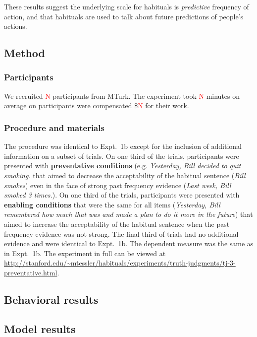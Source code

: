 \documentclass[10pt,letterpaper]{article}
\newcommand{\red}[1]{\textcolor{Red}{#1}}
\begin{document}
These results suggest the underlying scale for habituals is \emph{predictive} frequency of action, and that habituals are used to talk about future predictions of people's actions.

\subsection{Method}

\subsubsection{Participants} 

We recruited \red{N} participants from MTurk.
The experiment took \red{N} minutes on average on participants were compensated \$\red{N} for their work.

\subsubsection{Procedure and materials}

The procedure was identical to Expt.~1b except for the inclusion of additional information on a subset of trials. 
On one third of the trials, participants were presented with \textbf{preventative conditions} (e.g. \emph{Yesterday, Bill decided to quit smoking.} that aimed to decrease the acceptability of the habitual sentence (\emph{Bill smokes}) even in the face of strong past frequency evidence (\emph{Last week, Bill smoked 3 times.}).
On one third of the trials, participants were presented with \textbf{enabling conditions} that were the same for all items (\emph{Yesterday, Bill remembered how much that was and made a plan to do it more in the future}) that aimed to increase the acceptability of the habitual sentence when the past frequency evidence was not strong. 
The final third of trials had no additional evidence and were identical to Expt.~1b. 
The dependent measure was the same as in Expt.~1b. 
The experiment in full can be viewed at \url{http://stanford.edu/~mtessler/habituals/experiments/truth-judgments/tj-3-preventative.html}.


\subsection{Behavioral results}

\subsection{Model results}
\end{document}
